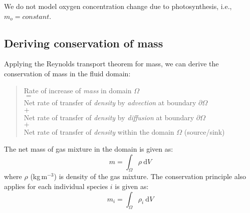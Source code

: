 \begin{assumption}
	We do not model oxygen concentration change due to photosynthesis, i.e., $m_o = \textit{constant}$.
\end{assumption}

\subsection{Deriving conservation of mass}

Applying the Reynolds transport theorem for mass, we can derive the conservation of mass in the fluid domain:

\begin{quote}
	\centering
	Rate of increase of \textit{mass} in domain $\Omega$\\
	$=$\\
	Net rate of transfer of \textit{density} by \textit{advection} at boundary $\partial \Omega$\\
	$+$ \\
	Net rate of transfer of \textit{density} by \textit{diffusion} at boundary $\partial \Omega$\\
	$+$\\
	Net rate of transfer of \textit{density} within the domain $\Omega$ (source/sink)
\end{quote}

The net mass of gas mixture in the domain is given as:
\begin{equation}
m = \int_\Omega  \rho \:\mathrm{d}V
\end{equation}
where $\rho$ (kg\,m$^{-3}$) is density of the gas mixture. The conservation principle also applies for each individual species $i$ is given as:
\begin{equation}
{m_i} = \int_\Omega  {{\rho _i}\:\mathrm{d}V}
\end{equation}

